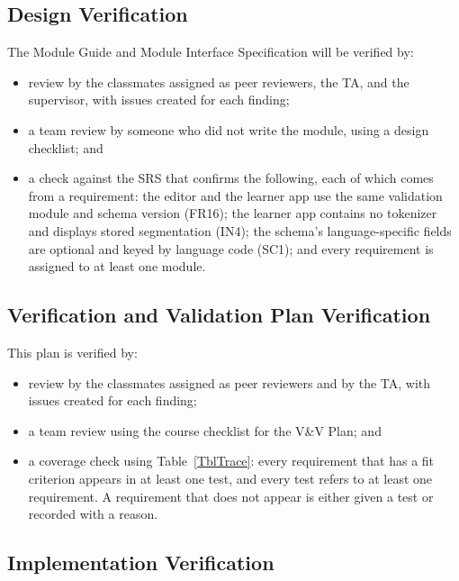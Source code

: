 \documentclass[12pt, titlepage]{article}
\begin{document}
\subsection{Design Verification}\label{SecDesignVer}

The Module Guide and Module Interface Specification will be verified by:

\begin{itemize}
  \item review by the classmates assigned as peer reviewers, the TA, and the
        supervisor, with issues created for each finding;
  \item a team review by someone who did not write the module, using a design
        checklist; and
  \item a check against the SRS that confirms the following, each of which
        comes from a requirement: the editor and the learner app use the same
        validation module and schema version (FR16); the learner app contains
        no tokenizer and displays stored segmentation (IN4); the schema's
        language-specific fields are optional and keyed by language code (SC1);
        and every requirement is assigned to at least one module.
\end{itemize}

\subsection{Verification and Validation Plan Verification}

This plan is verified by:

\begin{itemize}
  \item review by the classmates assigned as peer reviewers and by the TA, with
        issues created for each finding;
  \item a team review using the course checklist for the V\&V Plan; and
  \item a coverage check using Table~\ref{TblTrace}: every requirement that has
        a fit criterion appears in at least one test, and every test
        refers to at least one requirement. A requirement that does not
        appear is either given a test or recorded with a reason.
\end{itemize}

\subsection{Implementation Verification}\label{SecImplVer}
\end{document}
